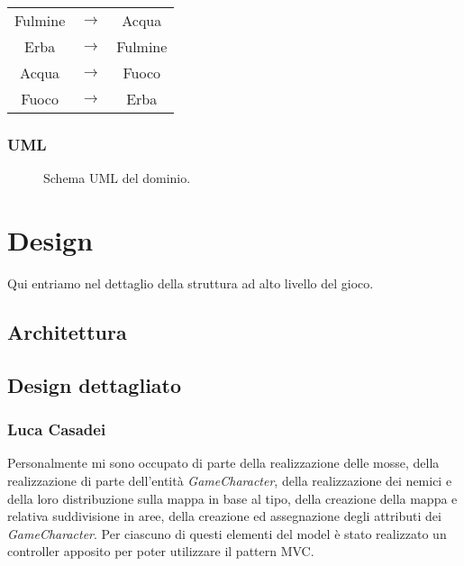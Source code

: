 \documentclass[a4paper,12pt]{report}
\begin{document}
\begin{center}
\begin{tabular}{ c c c }
    Fulmine & $\rightarrow$ & Acqua \\
    Erba & $\rightarrow$ & Fulmine \\
    Acqua & $\rightarrow$ & Fuoco \\
    Fuoco & $\rightarrow$ & Erba \\
\end{tabular}
\end{center}

\subsection{UML}
\begin{figure}[H]
	\centering
	
	\caption{Schema UML del dominio.} \label{fig:Schema UML del dominio.}
\end{figure}

\chapter{Design}

Qui entriamo nel dettaglio della struttura ad alto livello del gioco.

\section{Architettura}

\section{Design dettagliato}
\subsection*{Luca Casadei}
Personalmente mi sono occupato di parte della realizzazione delle mosse, della realizzazione di parte dell'entità \textit{GameCharacter}, della realizzazione dei nemici e della loro distribuzione sulla mappa in base al tipo, della creazione della mappa e relativa suddivisione in aree, della creazione ed assegnazione degli attributi dei \textit{GameCharacter}. Per ciascuno di questi elementi del model è stato realizzato un controller apposito per poter utilizzare il pattern MVC.
\end{document}
